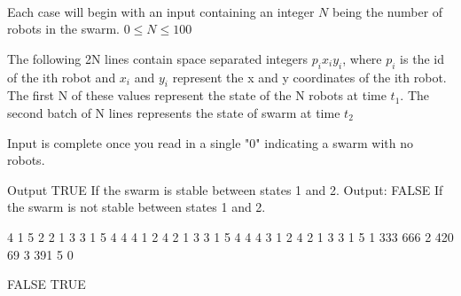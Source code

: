 \documentclass{article}
\begin{document}
\needspace{5em}
\\
\begin{inputDescription}
Each case will begin with an input containing an integer $N$ being the number of robots in the swarm. $0 \leq N \leq 100$

The following 2N lines contain space separated integers $p_i x_i y_i$, where $p_i$ is the id of the ith robot and $x_i$ and $y_i$ represent the x and y coordinates of the ith robot.
The first N of these values represent the state of the N robots at time $t_1$. The second batch of N lines represents the state of swarm at time $t_2$

Input is complete once you read in a single "0" indicating a swarm with no robots. 
\end{inputDescription}

\begin{outputDescription}
Output TRUE If the swarm is stable between states 1 and 2.
Output: FALSE If the swarm is not stable between states 1 and 2. 
\end{outputDescription}

\begin{sampleInput}
4
1 5 2
2 1 3
3 1 5
4 4 4
1 2 4
2 1 3
3 1 5
4 4 4
3
1 2 4
2 1 3
3 1 5
1 333 666
2 420 69
3 391 5
0
\end{sampleInput}
\begin{sampleOutput}
FALSE
TRUE
\end{sampleOutput}
\end{document}
